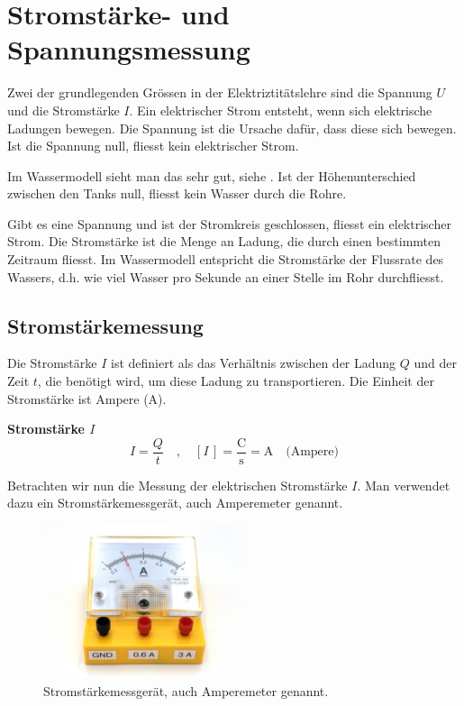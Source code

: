 
\newpage
\chapter{Stromstärke- und Spannungsmessung}

Zwei der grundlegenden Grössen in der Elektriztitätslehre sind die Spannung $U$ und die Stromstärke $I$.
Ein elektrischer Strom entsteht, wenn sich elektrische Ladungen bewegen.
Die Spannung ist die Ursache dafür, dass diese sich bewegen. Ist die Spannung null, fliesst kein elektrischer Strom.

Im Wassermodell sieht
man das sehr gut, siehe . Ist der Höhenunterschied zwischen den Tanks null, fliesst kein
Wasser durch die Rohre.

Gibt es eine Spannung und ist der Stromkreis geschlossen, fliesst ein elektrischer Strom.
Die Stromstärke ist die Menge an Ladung, die durch einen bestimmten Zeitraum fliesst.
Im Wassermodell entspricht die Stromstärke der Flussrate des Wassers, d.h. wie viel Wasser pro Sekunde
an einer Stelle im Rohr durchfliesst.


\section{Stromstärkemessung}

Die Stromstärke $I$ ist definiert als das Verhältnis zwischen der Ladung $Q$ und der Zeit $t$,
die benötigt wird, um diese Ladung zu transportieren. Die Einheit der Stromstärke ist
Ampere ($\unit{\ampere}$).

\begin{greenbox}
\textbf{Stromstärke $I$}
$$
    I = \frac{Q}{t} \quad,\quad \left[ I \, \right] = \frac{\unit{\coulomb}}{\unit{\second}} = \unit{\ampere} \quad \text{(Ampere)}
$$
\end{greenbox}


Betrachten wir nun die Messung der elektrischen Stromstärke $I$. Man verwendet dazu ein
Stromstärkemessgerät, auch Amperemeter genannt.

\begin{figure}[h!]
    \centering
    \includegraphics[width=6cm]{_images/ampere_meter}
    \caption{Stromstärkemessgerät, auch Amperemeter genannt.}
    \label{fig:amperemeter}
\end{figure}

